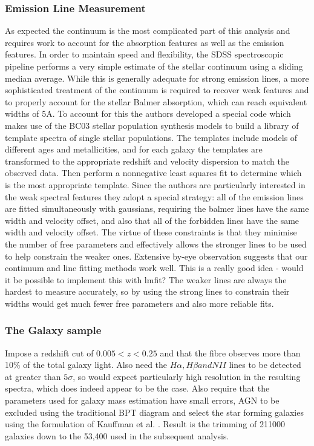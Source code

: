 \documentclass{literature}
\begin{document}
\subsubsection{Emission Line Measurement}
As expected the continuum is the most complicated part of this analysis and requires work to account for the absorption features as well as the emission features. In order to maintain speed and flexibility, the SDSS spectroscopic pipeline performs a very simple estimate of the stellar continuum using a sliding median average. While this is generally adequate for strong emission lines, a more sophisticated treatment of the continuum is required to recover weak features and to properly account for the stellar Balmer absorption, which can reach equivalent widths of 5A. To account for this the authors developed a special code which makes use of the BC03 \citep{Bruzual2003} stellar population synthesis models to build a library of template spectra of single stellar populations. The templates include models of different ages and metallicities, and for each galaxy the templates are transformed to the appropriate redshift and velocity dispersion to match the observed data. Then perform a nonnegative least squares fit to determine which is the most appropriate template. Since the authors are particularly interested in the weak spectral features they adopt a special strategy: all of the emission lines are fitted simultaneously with gaussians, requiring the balmer lines have the same width and velocity offset, and also that all of the forbidden lines have the same width and velocity offset. The virtue of these constraints is that they minimise the number of free parameters and effectively allows the stronger lines to be used to help constrain the weaker ones. Extensive by-eye observation suggests that our continuum and line fitting methods work well. This is a really good idea - would it be possible to implement this with lmfit? The weaker lines are always the hardest to measure accurately, so by using the strong lines to constrain their widths would get much fewer free parameters and also more reliable fits. 

\subsubsection{The Galaxy sample}
Impose a redshift cut of $0.005 < z < 0.25$ and that the fibre observes more than 10$\%$ of the total galaxy light. Also need the $H\alpha, H\beta and NII$ lines to be detected at greater than $5\sigma$, so would expect particularly high resolution in the resulting spectra, which does indeed appear to be the case. Also require that the parameters used for galaxy mass estimation have small errors, AGN to be excluded using the traditional BPT diagram and select the star forming galaxies using the formulation of Kauffman et al. \citep{Kauffmann2003}. Result is the trimming of 211000 galaxies down to the 53,400 used in the subsequent analysis. 
\end{document}
